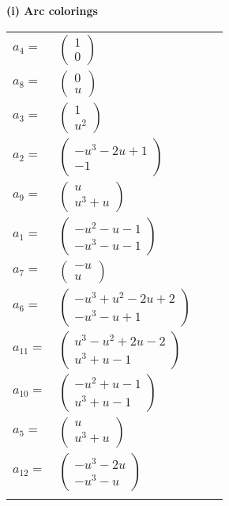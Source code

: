\documentclass[1p]{elsarticle_modified}
\theoremstyle{definition}
\begin{document}
\flushleft \textbf{(i) Arc colorings}\\
\begin{tabular}{m{7pt} m{180pt} m{7pt} m{180pt} }
\flushright $a_{4}=$&$\begin{pmatrix}1\\0\end{pmatrix}$ \\
\flushright $a_{8}=$&$\begin{pmatrix}0\\u\end{pmatrix}$ \\
\flushright $a_{3}=$&$\begin{pmatrix}1\\u^2\end{pmatrix}$ \\
\flushright $a_{2}=$&$\begin{pmatrix}- u^3-2 u+1\\-1\end{pmatrix}$ \\
\flushright $a_{9}=$&$\begin{pmatrix}u\\u^3+u\end{pmatrix}$ \\
\flushright $a_{1}=$&$\begin{pmatrix}- u^2- u-1\\- u^3- u-1\end{pmatrix}$ \\
\flushright $a_{7}=$&$\begin{pmatrix}- u\\u\end{pmatrix}$ \\
\flushright $a_{6}=$&$\begin{pmatrix}- u^3+u^2-2 u+2\\- u^3- u+1\end{pmatrix}$ \\
\flushright $a_{11}=$&$\begin{pmatrix}u^3- u^2+2 u-2\\u^3+u-1\end{pmatrix}$ \\
\flushright $a_{10}=$&$\begin{pmatrix}- u^2+u-1\\u^3+u-1\end{pmatrix}$ \\
\flushright $a_{5}=$&$\begin{pmatrix}u\\u^3+u\end{pmatrix}$ \\
\flushright $a_{12}=$&$\begin{pmatrix}- u^3-2 u\\- u^3- u\end{pmatrix}$\\&\end{tabular}
\end{document}
